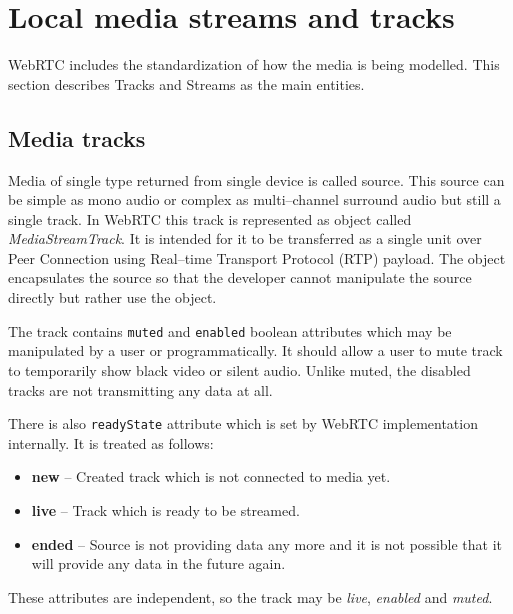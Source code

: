 







\section{Local media streams and tracks}
WebRTC includes the standardization of how the media is being modelled. This section describes Tracks and Streams as the main entities.



\subsection{Media tracks}
Media of single type returned from single device is called source. This source can be simple as mono audio or complex as multi--channel surround audio but still a single track. In WebRTC this track is represented as object called \textit{MediaStreamTrack}. It is intended for it to be transferred as a single unit over Peer Connection using Real--time Transport Protocol (RTP) payload. The object encapsulates the source so that the developer cannot manipulate the source directly but rather use the object.

The track contains \verb|muted| and \verb|enabled| boolean attributes which may be manipulated by a user or programmatically. It should allow a user to mute track to temporarily show black video or silent audio. Unlike muted, the disabled tracks are not transmitting any data at all.

There is also \verb|readyState| attribute which is set by WebRTC implementation internally.  It is treated as follows:

\begin{itemize}
	\item \textbf{new} -- Created track which is not connected to media yet.
	\item \textbf{live} -- Track which is ready to be streamed.
	\item \textbf{ended} -- Source is not providing data any more and it is not possible that it will provide any data in the future again.
\end{itemize}

These attributes are independent, so the track may be \textit{live}, \textit{enabled} and \textit{muted}.


